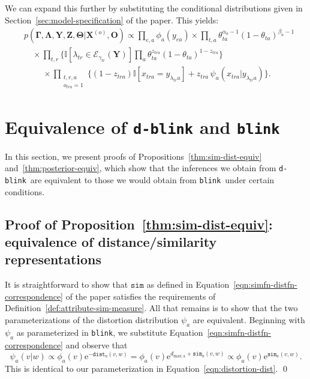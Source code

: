 \documentclass[12pt,letterpaper]{article}
\renewcommand\vec{\bm}
\newcommand{\simfn}{\mathtt{sim}} %
\newcommand{\distfn}{\mathtt{dist}} %
\newcommand{\partset}{\mathcal{E}} %
\newcommand{\1}[1]{\mathbb{I}\!\left[#1\right]} %
\newcommand{\euler}{\mathrm{e}} %
\newcommand{\dblink}{\texttt{\upshape \lowercase{d-blink}}} %
\newcommand{\blink}{\texttt{\upshape \lowercase{blink}}} %
\begin{document}
We can expand this further by substituting the conditional distributions 
given in Section~\ref{sec:model-specification} of the paper.
This yields:
\begin{equation}
\begin{split}
& p(\vec{\Gamma}, \vec{\Lambda}, \vec{Y}, \vec{Z}, \vec{\Theta}|\vec{X}^{(o)}, \vec{O}) \propto 
  \prod_{e,a} \phi_{a}(y_{ea}) \times \prod_{t,a} \theta_{ta}^{\alpha_{a} - 1} (1 - \theta_{ta})^{\beta_{a} - 1} \\
& \quad {} \times \prod_{t,r} \Big\{ \1{\lambda_{tr} \in 
  \partset_{\gamma_{tr}}(\vec{Y})} \prod_{a} \theta_{ta}^{z_{tra}} (1 - \theta_{ta})^{1-z_{tra}} \Big\} \\
& \mspace{40mu} {} \times  \prod_{\substack{t,r,a\\o_{tra}=1}} 
  \Big\{ (1 - z_{tra}) \1{x_{tra} = y_{\lambda_{tr}a}} 
  + z_{tra} \, \psi_{a}(x_{tra}|y_{\lambda_{tr}a}) \Big\}.
\end{split}
\label{app-eqn:expanded-posterior}
\end{equation}

\section{Equivalence of \texorpdfstring{\dblink}{d-blink} and \texorpdfstring{\blink}{blink}}
In this section, we present proofs of 
Propositions~\ref{thm:sim-dist-equiv} and~\ref{thm:posterior-equiv}, 
which show that the inferences we obtain from \dblink\ are equivalent to those 
we would obtain from \blink\ under certain conditions.

\subsection{Proof of Proposition~\ref{thm:sim-dist-equiv}: equivalence of 
distance\slash similarity representations}
\label{app-sec:proof-sim-dist-equiv}
It is straightforward to show that $\simfn$ as defined in 
Equation~\ref{eqn:simfn-distfn-correspondence} of the paper satisfies 
the requirements of Definition~\ref{def:attribute-sim-measure}.
All that remains is to show that the two parameterizations of the distortion 
distribution $\psi_{a}$ are equivalent.
Beginning with $\psi_{a}$ as parameterized in \blink, we substitute 
Equation~\ref{eqn:simfn-distfn-correspondence} and observe that
\begin{equation*}
\psi_{a}(v|w) \propto \phi_{a}(v) \euler^{-\distfn_{a}(v, w)} 
   = \phi_{a}(v) \euler^{d_\mathrm{max;a} + \simfn_{a}(v, w)} 
   \propto \phi_{a}(v) \euler^{\simfn_{a}(v, w)}.
\end{equation*}
This is identical to our parameterization in 
Equation~\ref{eqn:distortion-dist}. \qed
\end{document}
